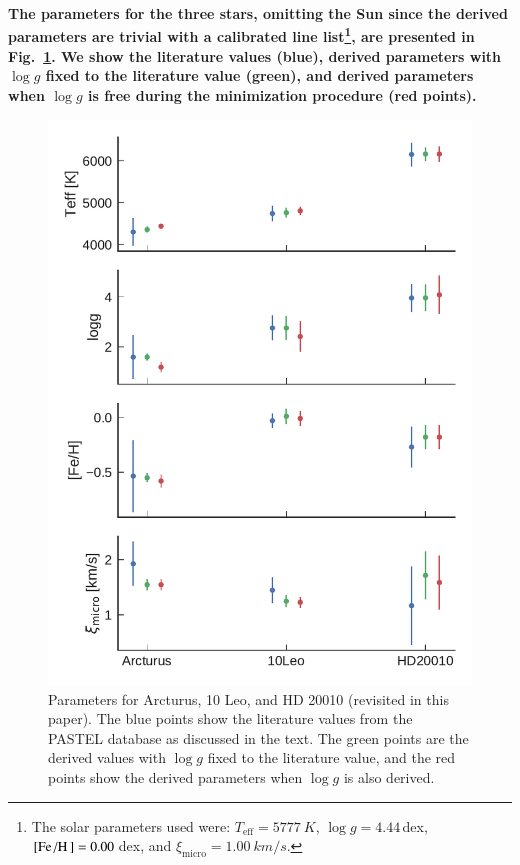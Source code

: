 \documentclass{aa}
\begin{document}
{\bf The parameters for the three stars, omitting the Sun since the derived
parameters are trivial with a calibrated line list\footnote{The solar parameters
used were: $T_\mathrm{eff}=\SI{5777}{K}$, $\log g=4.44\,$dex,
$[\ion{Fe}/\ion{H}]=0.00\,$dex, and $\xi_\mathrm{micro}=\SI{1.00}{km/s}$.}, are
presented in Fig.~\ref{fig:parameters}. We show the literature values (blue),
derived parameters with $\log g$ fixed to the literature value (green), and
derived parameters when $\log g$ is free during the minimization procedure (red
points).}

\begin{figure}[htpb!]
    \centering
    \includegraphics[width=1.0\linewidth]{figures/parameters.pdf}
    \caption{Parameters for Arcturus, 10 Leo, and HD 20010 (revisited in this
             paper). The blue points show the literature values from the PASTEL
             database as discussed in the text. The green points are the
             derived values with $\log g$ fixed to the literature value, and the
             red points show the derived parameters when $\log g$ is also
             derived.}
    \label{fig:parameters}
\end{figure}
\end{document}
